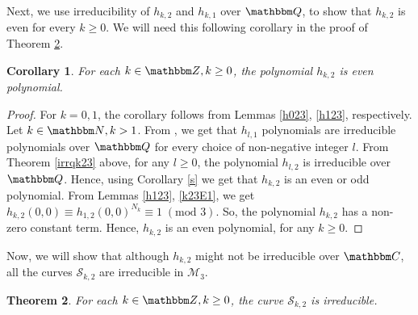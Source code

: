 \documentclass[reqno]{amsart}
\numberwithin{equation}{section}
\theoremstyle{plain}
\newtheorem{theorem}{Theorem}[section]
\newtheorem{corollary}[theorem]{Corollary}
\theoremstyle{definition}
\theoremstyle{definition}
\newcommand{\Q}{{\mathbbm Q}}
\newcommand{\Z}{{\mathbbm Z}}
\newcommand{\C}{{\mathbbm C}}
\newcommand{\N}{{\mathbbm N}}
\begin{document}
    Next, we use irreducibility of $h_{k,2}$ and $h_{k,1}$ over $\Q$, to show that $h_{k,2}$ is even for every $k\geq 0$. We will need this following corollary in the proof of Theorem \ref{irrck23}. 
    \begin{corollary}\label{k23even}
        For each $k\in \Z, k\geq 0$, the polynomial $h_{k,2}$ is even polynomial.
    \end{corollary}
    \begin{proof}
        For $k=0,1$, the corollary follows from Lemmas \ref{h023}, \ref{h123}, respectively. Let $k\in \N, k>1$. From \cite[Theorem~$5.8$]{Pat23}, we get that $h_{l,1}$ polynomials are irreducible polynomials over $\Q$ for every choice of non-negative integer $l$. From Theorem \ref{irrqk23} above, for any $l\geq 0$, the polynomial $h_{l,2}$ is irreducible over $\Q$.  Hence, using Corollary \ref{s} we get that $h_{k,2}$ is an even or odd polynomial. From Lemmas \ref{h123}, \ref{k23E1},  we get $h_{k,2}(0,0)\equiv h_{1,2}(0,0)^{N_{k}} \equiv 1\;(\text{mod }3)$. So, the polynomial $h_{k,2}$ has a non-zero constant term. Hence, $h_{k,2}$ is an even polynomial, for any $k\geq 0$.
    \end{proof}
    Now, we will show that although $h_{k,2}$ might not be irreducible over $\C$, all the curves $\mathscr{S}_{k,2}$ are irreducible in $\mathcal{M}_{3}$.
    \begin{theorem}\label{irrck23}
        For each $k\in \Z, k \geq 0$, the curve $\mathscr{S}_{k,2}$ is irreducible.
    \end{theorem}
    \vspace{-0.1in}
\end{document}
